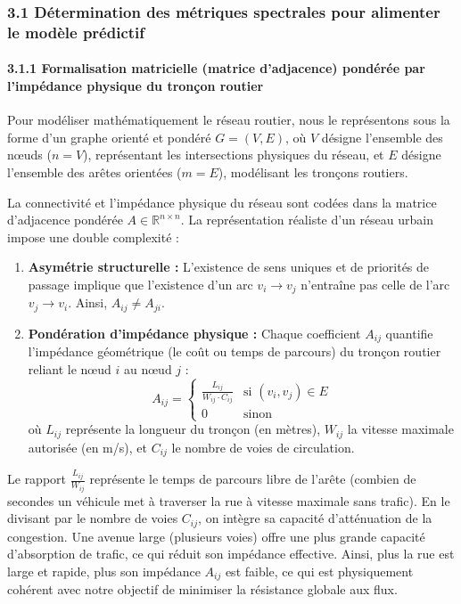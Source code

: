 \documentclass[10pt, a4paper]{article}
\providecommand{\tightlist}{}
\begin{document}
\subsubsection{3.1 Détermination des métriques spectrales pour alimenter
le modèle
prédictif}\label{duxe9termination-des-muxe9triques-spectrales-pour-alimenter-le-moduxe8le-pruxe9dictif}

\paragraph{3.1.1 Formalisation matricielle (matrice d'adjacence)
pondérée par l'impédance physique du tronçon
routier}\label{formalisation-matricielle-matrice-dadjacence-ponduxe9ruxe9e-par-limpuxe9dance-physique-du-tronuxe7on-routier}

Pour modéliser mathématiquement le réseau routier, nous le représentons
sous la forme d'un graphe orienté et pondéré \(G = (V, E)\), où \(V\)
désigne l'ensemble des nœuds (\(n = V\)), représentant les intersections
physiques du réseau, et \(E\) désigne l'ensemble des arêtes orientées
(\(m = E\)), modélisant les tronçons routiers.

La connectivité et l'impédance physique du réseau sont codées dans la
matrice d'adjacence pondérée \(A \in \mathbb{R}^{n \times n}\). La
représentation réaliste d'un réseau urbain impose une double complexité
:

\begin{enumerate}
\def\labelenumi{\arabic{enumi}.}
\tightlist
\item
  \textbf{Asymétrie structurelle :} L'existence de sens uniques et de
  priorités de passage implique que l'existence d'un arc \(v_i \to v_j\)
  n'entraîne pas celle de l'arc \(v_j \to v_i\). Ainsi,
  \(A_{ij} \neq A_{ji}\).
\item
  \textbf{Pondération d'impédance physique :} Chaque coefficient
  \(A_{ij}\) quantifie l'impédance géométrique (le coût ou temps de
  parcours) du tronçon routier reliant le nœud \(i\) au nœud \(j\) :
  \[A_{ij} = \begin{cases} \frac{L_{ij}}{W_{ij} \cdot C_{ij}} & \text{si } (v_i, v_j) \in E \\ 0 & \text{sinon} \end{cases}\]
  où \(L_{ij}\) représente la longueur du tronçon (en mètres),
  \(W_{ij}\) la vitesse maximale autorisée (en m/s), et \(C_{ij}\) le
  nombre de voies de circulation.
\end{enumerate}

Le rapport \(\frac{L_{ij}}{W_{ij}}\) représente le temps de parcours
libre de l'arête (combien de secondes un véhicule met à traverser la rue
à vitesse maximale sans trafic). En le divisant par le nombre de voies
\(C_{ij}\), on intègre sa capacité d'atténuation de la congestion. Une
avenue large (plusieurs voies) offre une plus grande capacité
d'absorption de trafic, ce qui réduit son impédance effective. Ainsi,
plus la rue est large et rapide, plus son impédance \(A_{ij}\) est
faible, ce qui est physiquement cohérent avec notre objectif de
minimiser la résistance globale aux flux.
\end{document}
